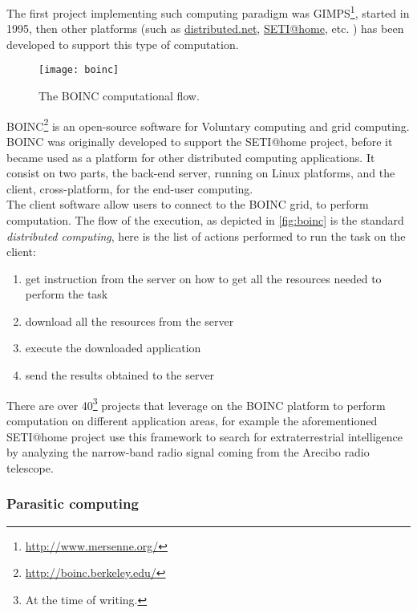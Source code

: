 The first project implementing such computing paradigm was
\ac{GIMPS}\footnote{\url{http://www.mersenne.org/}}, started in 1995, then other
platforms (such as \href{http://www.distributed.net/}{distributed.net},
\href{http://setiathome.berkeley.edu/}{SETI@home}, etc. ) has been developed to
support this type of computation.

\begin{figure}[htb]
    \centering
    \texttt{[image: boinc]}
    \caption{The \acs{BOINC} computational flow.}
    \label{fig:boinc}
\end{figure}
\acf{BOINC}\footnote{\url{http://boinc.berkeley.edu/}} is an open-source software
for Voluntary computing and grid computing. \ac{BOINC} was originally developed
to support the \acf{SETI@home} project, before it became used as a platform for
other distributed computing applications. It consist on two parts, the back-end
server, running on Linux platforms, and the client, cross-platform, for the
end-user computing.\\

The client software allow users to connect to the \ac{BOINC} grid, to perform
computation. The flow of the execution, as depicted in \autoref{fig:boinc} is
the standard \emph{distributed computing}, here is the list of actions performed
to run the task on the client:
\begin{enumerate}
    \item get instruction from the server on how to get all the resources needed
    to perform the task
    \item download all the resources from the server
    \item execute the downloaded application
    \item send the results obtained to the server
\end{enumerate}

There are over 40\footnote{At the time of writing.} projects that leverage on
the \ac{BOINC} platform to perform computation on different application areas,
for example the aforementioned \ac{SETI@home} project use this framework to
search for extraterrestrial intelligence by analyzing the narrow-band radio
signal coming from the Arecibo radio telescope.


\subsubsection{Parasitic computing}
\label{sec:bg:crowd:auto:parasitic}
